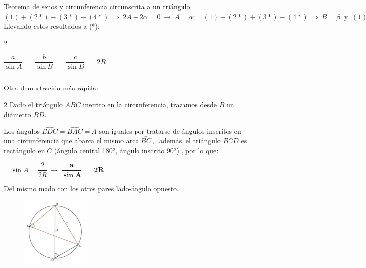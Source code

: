 \begin{myalertblock}{Teorema de senos y circunferencia circunscrita a un triángulo}
\vspace{2mm} $(1)+(2*)-(3*)-(4*) \ \Rightarrow \ 2A-2\alpha=0 \ \to \ A=\alpha;\quad (1)-(2*)+(3*)-(4*) \ \Rightarrow \ B=\beta \ \text{ y } \ (1)-(2*)-(3*)+(4*) \ \Rightarrow \ C=\gamma\ $ Llevando estos resultados a (*):

\begin{multicols}{2}
	\begin{center} $ \dfrac{a}{\sin A} \ = \  \dfrac{b}{\sin B} \ = \  \dfrac{c}{\sin D} \ = \ 2R $  \end{center} \QED
\end{multicols}
\vspace{-3mm}

\begin{center}\rule{250pt}{0.1pt} \end{center}

\begin{small}
\underline{Otra demostración} más rápida:

\begin{multicols}{2}
Dado el triángulo $ABC$ inscrito en la circunferencia, trazamos desde $B$ un diámetro $BD$.

Los ángulos $\widehat{BDC}=\widehat{BAC}=A$ son iguales por tratarse de ángulos inscritos en una circunferencia que abarca el mismo arco 
$\stackrel{\textstyle\frown}{BC}\, , \  $ además, el triángulo $BCD$ es rectángulo en $C$ (ángulo central 180$^o$, ángulo inscrito 90$^o$) , por lo que:

$\quad  \sin A=\dfrac {2}{2R} \ \to \ \boldsymbol{ \dfrac{a}{\sin A}\ = \ 2R } $

Del mismo modo con los otros pares lado-ángulo opuesto. \QED
\begin{figure}[H]
	\centering
	\includegraphics[width=0.3\textwidth]{img-triang/triang08.png}
\end{figure}	

\end{multicols}

\end{small}
\end{myalertblock}

